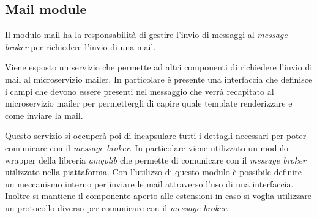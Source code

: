 \subsection{Mail module}
Il modulo mail ha la responsabilità di gestire l'invio di messaggi al \textit{message broker} per richiedere
l'invio di una mail.

Viene esposto un servizio che permette ad altri componenti di richiedere l'invio di mail al microservizio mailer.
In particolare è presente una interfaccia che definisce i campi che devono essere presenti
nel messaggio che verrà recapitato al microservizio mailer per permettergli di capire quale
template renderizzare e come inviare la mail.

Questo servizio si occuperà poi di incapsulare tutti i dettagli necessari per poter comunicare con il
\textit{message broker}. In particolare viene utilizzato un modulo wrapper della libreria \textit{amqplib} che permette di comunicare
con il \textit{message broker} utilizzato nella piattaforma.
Con l'utilizzo di questo modulo è possibile definire un meccanismo interno per inviare le mail
attraverso l'uso di una interfaccia. Inoltre si mantiene il componente aperto alle estensioni
in caso si voglia utilizzare un protocollo diverso per comunicare con il \textit{message broker}.